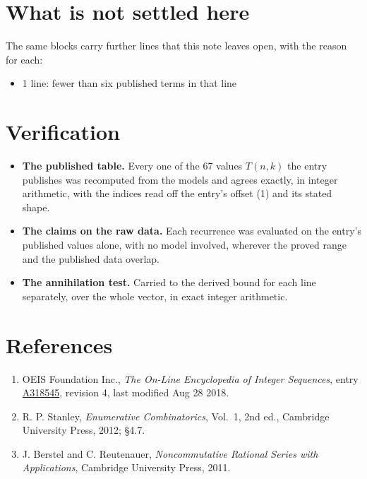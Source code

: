 \documentclass[11pt]{article}
\theoremstyle{definition}
\begin{document}
\section{What is not settled here}

The same blocks carry further lines that this note leaves open, with the reason for each:

\begin{itemize}

\item 1 line: fewer than six published terms in that line

\end{itemize}

\section{Verification}

\begin{itemize}

\item {\bfseries The published table.} Every one of the 67 values $T(n,k)$ the entry publishes was recomputed from the models and agrees exactly, in integer arithmetic, with the indices read off the entry's offset (1) and its stated shape.

\item {\bfseries The claims on the raw data.} Each recurrence was evaluated on the entry's published values alone, with no model involved, wherever the proved range and the published data overlap.

\item {\bfseries The annihilation test.} Carried to the derived bound for each line separately, over the whole vector, in exact integer arithmetic.

\end{itemize}

\section{References}

\begin{enumerate}

\item OEIS Foundation Inc., \emph{The On-Line Encyclopedia of Integer Sequences}, entry \href{https://oeis.org/A318545}{A318545}, revision 4, last modified Aug 28 2018.

\item R. P. Stanley, \emph{Enumerative Combinatorics}, Vol.~1, 2nd ed., Cambridge University Press, 2012; \S4.7.

\item J. Berstel and C. Reutenauer, \emph{Noncommutative Rational Series with Applications}, Cambridge University Press, 2011.

\end{enumerate}
\end{document}
